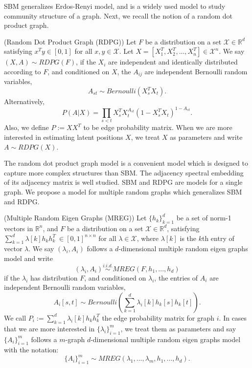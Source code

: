 \documentclass[10pt,journal,compsoc]{IEEEtran}
\newenvironment{definition}[1][Definition]{\begin{trivlist}
		\item[\hskip \labelsep {\bfseries #1}]}{\end{trivlist}}
\begin{document}
\noindent SBM generalizes Erdos-Renyi model\cite{erdds1959random}, and is a widely used model to study community structure of a graph\cite{karrer2011stochastic}\cite{lyzinski2015community}. Next, we recall the notion of a random dot product graph\cite{young2007random}. 

\begin{definition} (Random Dot Product Graph (RDPG)) Let $F$ be a distribution on a set $\mathcal{X} \in \mathbb{R}^d$ satisfying $x^T y \in [0, 1]$ for all $x, y \in \mathcal{X}$. Let $X=[X_1^T,X_2^T,...,X_n^T] \in \mathcal{X}^n$. We say $(X,A) \sim RDPG(F)$, if the $X_i$ are independent and identically distributed according to $F$, and conditioned on $X$, the $A_{ij}$ are independent Bernoulli random variables,
\[ A_{st} \sim Bernoulli(X_s^T X_t). \]
Alternatively,
\[ P(A|X) = \prod_{s<t} X_s^T X_t ^{ A_{st}} (1-X_s^T X_t)^{1- A_{st}}.\]
Also, we define $P:=XX^T$ to be edge probability matrix. When we are more interested in estimating latent positions $X$, we treat $X$ as parameters and write $A \sim RDPG(X)$.
\end{definition}
The random dot product graph model is a convenient model which is designed to capture more complex structures than SBM. The adjacency
spectral embedding of its adjacency matrix is well studied\cite{sussman2014consistent}. SBM and RDPG are models for a single graph. We propose a model for multiple random graphs which generalizes SBM and RDPG.
\begin{definition} (Multiple Random Eigen Graphs (MREG)) Let $\{h_k\}_{k=1}^{d}$ be a set of norm-1 vectors in $\mathbb{R}^{n}$, and  $F$ be a distribution on a set $\mathcal{X} \in \mathbb{R}^d$,  satisfying $\sum\limits_{k=1}^{d} \lambda [k] h_k  h_k^T \  \in [0, 1]^{n \times n} $ for all $\lambda \in \mathcal{X}$, where $\lambda[k]$ is the $k$th entry of vector $\lambda$. We say $(\lambda_i,A_i)$ follows a $d$-dimensional multiple random eigen graphs model and write
\[(\lambda_i,A_i) \overset{i.i.d.}{\sim} MREG(F,h_1,...,h_d)\]
if the $\lambda_i$ has distribution $F$, and conditioned on $\lambda_i$, the entries of $A_i$ are independent Bernoulli random variables,
\[ A_{i}[s,t] \sim Bernoulli( \sum_{k=1}^{d} \lambda_{i}[k] h_{k} [s] h_{k} [t] ). \]
We call $P_i:=\sum_{k=1}^{d} \lambda_i [k] h_k  h_k^T$ the edge probability matrix for graph $i$. In cases that we are more interested in $\{\lambda_i\}_{i=1}^m$, we treat them as parameters and say $\{A_i\}_{i=1}^{m}$ follows a $m$-graph $d$-dimensional multiple random eigen graphs model with the notation:
\[\{A_i\}_{i=1}^{m} \sim MREG(\lambda_1,...,\lambda_m,h_1,...,h_d).\] 
\end{definition}
\end{document}
